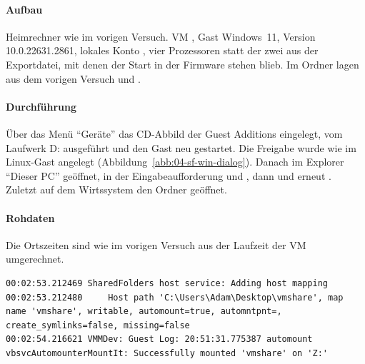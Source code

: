 \begin{messung}
\paragraph{Aufbau} Heimrechner wie im vorigen Versuch. VM , Gast Windows~11, Version 10.0.22631.2861, lokales Konto , vier Prozessoren statt der zwei aus der Exportdatei, mit denen der Start in der Firmware stehen blieb. Im Ordner  lagen aus dem vorigen Versuch  und .

\paragraph{Durchführung} Über das Menü \enquote{Geräte} das CD-Abbild der Guest Additions eingelegt,  vom Laufwerk D: ausgeführt und den Gast neu gestartet. Die Freigabe wurde wie im Linux-Gast angelegt (Abbildung~\ref{abb:04-sf-win-dialog}). Danach im Explorer \enquote{Dieser PC} geöffnet, in der Eingabeaufforderung  und , dann  und erneut . Zuletzt auf dem Wirtssystem den Ordner geöffnet.


\paragraph{Rohdaten} Die Ortszeiten sind wie im vorigen Versuch aus der Laufzeit der VM umgerechnet.

\begin{lstlisting}[caption={Zeilen zur Freigabe aus \texttt{VBox.log} der Windows-VM, Start 22:48:52},label={lst:sf-win-log}]
00:02:53.212469 SharedFolders host service: Adding host mapping
00:02:53.212480     Host path 'C:\Users\Adam\Desktop\vmshare', map name 'vmshare', writable, automount=true, automntpnt=, create_symlinks=false, missing=false
00:02:54.216621 VMMDev: Guest Log: 20:51:31.775387 automount vbsvcAutomounterMountIt: Successfully mounted 'vmshare' on 'Z:'
\end{lstlisting}



\end{messung}
